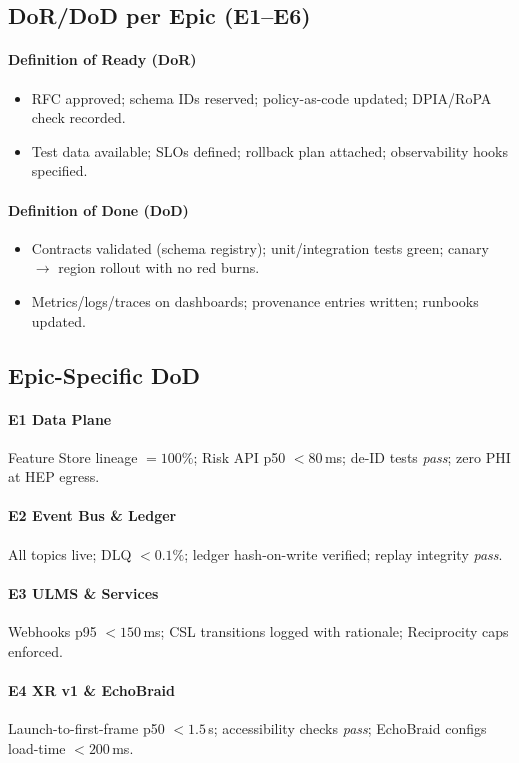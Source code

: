 \documentclass[11pt]{article}
\theoremstyle{plain}
\begin{document}
\subsection{DoR/DoD per Epic (E1--E6)}
\paragraph{Definition of Ready (DoR)}
\begin{itemize}
  \item RFC approved; schema IDs reserved; policy-as-code updated; DPIA/RoPA check recorded.
  \item Test data available; SLOs defined; rollback plan attached; observability hooks specified.
\end{itemize}
\paragraph{Definition of Done (DoD)}
\begin{itemize}
  \item Contracts validated (schema registry); unit/integration tests green; canary $\rightarrow$ region rollout with no red burns.
  \item Metrics/logs/traces on dashboards; provenance entries written; runbooks updated.
\end{itemize}

\subsection{Epic-Specific DoD}
\paragraph{E1 Data Plane}
Feature Store lineage $=100\%$; Risk API p50 $<80$\,ms; de-ID tests \emph{pass}; zero PHI at HEP egress.  
\paragraph{E2 Event Bus \& Ledger}
All topics live; DLQ $<0.1\%$; ledger hash-on-write verified; replay integrity \emph{pass}.  
\paragraph{E3 ULMS \& Services}
Webhooks p95 $<150$\,ms; CSL transitions logged with rationale; Reciprocity caps enforced.  
\paragraph{E4 XR v1 \& EchoBraid}
Launch-to-first-frame p50 $<1.5$\,s; accessibility checks \emph{pass}; EchoBraid configs load-time $<200$\,ms.  
\end{document}
